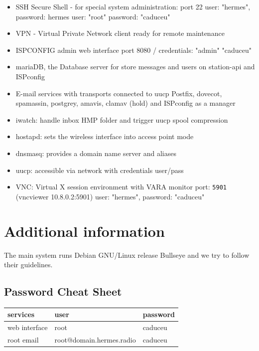 \documentclass[11pt,a4paper]{article}
\begin{document}
\begin{itemize}
    \item SSH Secure Shell - for special system administration: port 22\newline
        \hfill user: "hermes", password: hermes\newline
        \hfill user: "root" password: "caduceu"
    \item VPN -  Virtual Private Network client ready for remote maintenance 
    \item ISPCONFIG admin web interface\newline
        \hfill port 8080 / credentials: "admin" "caduceu"
    \item mariaDB, the Database server for store messages and users on station-api and ISPconfig
    \item E-mail  services with transports connected to uucp\newline
        \hfill Postfix, dovecot, spamassin, postgrey, amavis, clamav (hold) and ISPconfig as a manager 
    \item iwatch: handle inbox HMP folder and trigger uucp spool compression
    \item hostapd: sets the wireless interface into access point mode
    \item dnsmasq: provides a domain name server and aliases 
    \item uucp: accessible via network with credentials user/pass
    \item VNC: Virtual X session environment with VARA monitor
        \hfill port: \texttt{5901} (vncviewer 10.8.0.2:5901) 
        \hfill user: "hermes", password: "caduceu"
\end{itemize}

\section{Additional information}
\label{apx_adit_info}
    The main system runs Debian GNU/Linux release Bullseye and we try to follow their guidelines.

\subsection{Password Cheat Sheet}
\label{passwords}

\begin{table}[]
\centering
\begin{tabular}{|l|l|l|}
\hline
services      & user                     & password \\ \hline
web interface & root                     & caduceu  \\ \hline
root email    & root@domain.hermes.radio & caduceu  \\ \hline
\end{tabular}
\end{table}
\end{document}
